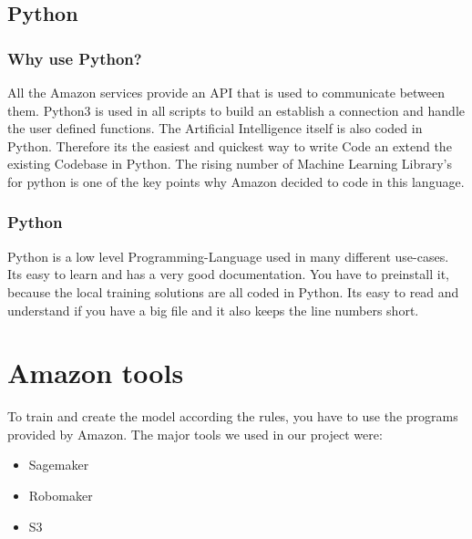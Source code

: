 \subsection{Python}

\subsubsection{Why use Python?}
All the Amazon services provide an API that is used to communicate between them. Python3 is used in all scripts to build an establish a connection and handle the user defined functions. The Artificial Intelligence itself is also coded in Python. Therefore its the easiest and quickest way to write Code an extend the existing Codebase in Python. The rising number of Machine Learning Library's for python is one of the key points why Amazon decided to code in this language.

\subsubsection{Python}
Python is a low level Programming-Language used in many different use-cases. Its easy to learn and has a very good documentation. You have to preinstall it, because the local training solutions are all coded in Python. Its easy to read and understand if you have a big file and it also keeps the line numbers short.

\section{Amazon tools}
To train and create the model according the rules, you have to use the programs provided by Amazon. The major tools we used in our project were:

\begin{itemize}
    \item Sagemaker
    \item Robomaker
    \item S3
\end{itemize}

